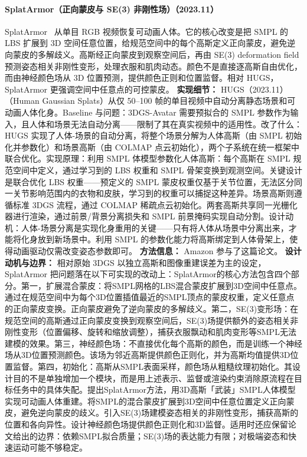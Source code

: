 \paragraph{SplatArmor（正向蒙皮与 SE(3) 非刚性场）（2023.11）}
SplatArmor~\cite{2311_10812} 从单目 RGB 视频恢复可动画人体。它的核心改变是把 SMPL 的 LBS 扩展到 3D 空间任意位置，给规范空间中的每个高斯定义正向蒙皮，避免逆向蒙皮的多解歧义。高斯经正向蒙皮到观察空间后，再由 SE(3) deformation field 预测姿态相关非刚性变形，处理衣服和肌肉动态。颜色不是直接逐高斯自由优化，而由神经颜色场从 3D 位置预测，提供颜色正则和位置监督。相对 HUGS，SplatArmor 更强调空间中任意点的可控蒙皮。
\textbf{实现细节：} HUGS（2023.11） （Human Gaussian Splats）从仅 50--100 帧的单目视频中自动分离静态场景和可动画人体化身。Baseline 与问题：3DGS-Avatar 需要预拟合的 SMPL 参数作为输入，且人体和场景无法自动分离——限制了其在真实视频中的适用性。改了什么：HUGS 实现了人体-场景的自动分离，将整个场景分解为人体高斯（由 SMPL 初始化并参数化）和场景高斯（由 COLMAP 点云初始化），两个子系统在统一框架中联合优化。实现原理：利用 SMPL 体模型参数化人体高斯：每个高斯在 SMPL 规范空间中定义，通过学习到的 LBS 权重和 SMPL 骨架变换到观测空间。关键设计是联合优化 LBS 权重——预定义的 SMPL 蒙皮权重仅基于关节位置，无法区分同一关节影响范围内的衣物和皮肤，学习到的权重可以捕捉这种差异。场景高斯则遵循标准 3DGS 流程，通过 COLMAP 稀疏点云初始化。两套高斯共享同一光栅化器进行渲染，通过前景/背景分离损失和 SMPL 前景掩码实现自动分割。设计动机：人体-场景分离是实现化身重用的关键——只有将人体从场景中分离出来，才能将化身放到新场景中。利用 SMPL 的参数化能力将高斯绑定到人体骨架上，使得动画驱动仅需改变姿态参数即可。
\textbf{方法信息：} Amazon 参与了这篇论文。
\textbf{设计动机与边界：} 相对原始 3DGS 以独立高斯和图像重建误差为主的设定，SplatArmor 把问题落在以下可实现的改动上：SplatArmor的核心方法包含四个部分。第一，扩展混合蒙皮：将SMPL网格的LBS混合蒙皮扩展到3D空间中任意点。通过在规范空间中为每个3D位置插值最近的SMPL顶点的蒙皮权重，定义任意点的正向蒙皮变换。正向蒙皮避免了逆向蒙皮的多解歧义。第二，SE(3)变形场：在规范空间的高斯通过正向蒙皮变换到观察空间后，SE(3)场提供额外的姿态相关非刚性变形（位置偏移、旋转和缩放调整），捕获衣服飘动和肌肉变形等SMPL无法建模的效果。第三，神经颜色场：不直接优化每个高斯的颜色，而是训练一个神经场从3D位置预测颜色。该场为邻近高斯提供颜色正则化，并为高斯均值提供3D位置监督。第四，初始化：高斯从SMPL表面采样，颜色场从粗糙纹理初始化。其设计目的不是单独增加一个模块，而是用上述表示、监督或渲染约束消除原流程在目标任务中的具体失配。提出SplatArmor方法，用3D高斯「武装」SMPL人体模型实现可动画人体重建。将SMPL的混合蒙皮扩展到3D空间中任意位置定义正向蒙皮，避免逆向蒙皮的歧义。引入SE(3)场建模姿态相关的非刚性变形，捕获高斯的位置和各向异性。设计神经颜色场提供颜色正则化和3D监督。适用时还应保留论文给出的边界：依赖SMPL拟合质量；SE(3)场的表达能力有限；对极端姿态和快速运动可能不够稳定。
